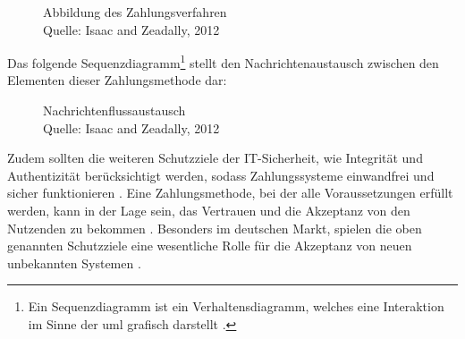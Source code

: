 \begin{figure}[H]
    \caption{Abbildung des Zahlungsverfahren\\ Quelle: Isaac and Zeadally, 2012}
    \label{fig:refart:JTAS}
\end{figure}

Das folgende Sequenzdiagramm\footnote{Ein Sequenzdiagramm ist ein Verhaltensdiagramm, welches eine Interaktion
im Sinne der \acrfull{uml} grafisch darstellt \cite{refbook:IASE}.} stellt den 
Nachrichtenaustausch zwischen den Elementen dieser Zahlungsmethode dar:

\vfill
\begin{figure}[H]
    \caption{Nachrichtenflussaustausch \\ Quelle: Isaac and Zeadally, 2012}
    \label{fig:refart:JTAS_2}
\end{figure}

Zudem sollten die weiteren Schutzziele der IT-Sicherheit, wie Integrität und Authentizität berücksichtigt werden, 
sodass Zahlungssysteme einwandfrei und sicher funktionieren \cite{refip:GMPS}. Eine Zahlungsmethode, bei der 
alle Voraussetzungen erfüllt werden, kann in der Lage sein, das Vertrauen und die Akzeptanz von den Nutzenden 
zu bekommen \cite{refart:HARE}. Besonders im deutschen Markt, spielen die oben genannten Schutzziele
eine wesentliche Rolle für die Akzeptanz von neuen unbekannten Systemen \cite{refip:DKAM}.

